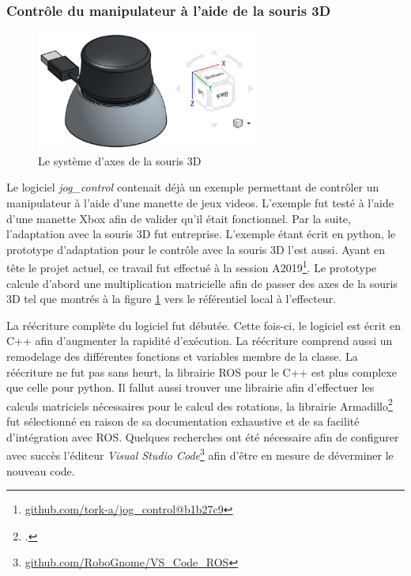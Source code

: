 \subsubsection{Contrôle du manipulateur à l'aide de la souris 3D}
\begin{figure}
    \centering
    \includegraphics[width=0.65\textwidth]{Figures/spacemouse_axis_4.png}
    \caption{Le système d'axes de la souris 3D}
    \label{fig:spacemouse_axis}
\end{figure}

Le logiciel \emph{jog\_control} contenait déjà un exemple permettant de contrôler un manipulateur à l'aide d'une manette de jeux videos. L'exemple fut testé à l'aide d'une manette Xbox afin de valider qu'il était fonctionnel. Par la suite, l'adaptation avec la souris 3D fut entreprise. L'exemple étant écrit en python, le prototype d'adaptation pour le contrôle avec la souris 3D l'est aussi. Ayant en tête le projet actuel, ce travail fut effectué à la session A2019\footnote{\href{https://github.com/tork-a/jog_control/commit/b1b27c9a034a166a8e04d271c7839f4741c848b4}{github.com/tork-a/jog\_control@b1b27c9}}. Le prototype calcule d'abord une multiplication matricielle afin de passer des axes de la souris 3D tel que montrés à la figure \ref{fig:spacemouse_axis} vers le référentiel local à l'effecteur. 


La réécriture complète du logiciel fut débutée. Cette fois-ci, le logiciel est écrit en C++ afin d'augmenter la rapidité d'exécution. La réécriture comprend aussi un remodelage des différentes fonctions et variables membre de la classe. La réécriture ne fut pas sans heurt, la librairie ROS pour le C++ est plus complexe que celle pour python. Il fallut aussi trouver une librairie afin d'effectuer les calculs matriciels nécessaires pour le calcul des rotations, la librairie Armadillo\footcite{sanderson_armadillo_2016} fut sélectionné en raison de sa documentation exhaustive et de sa facilité d'intégration avec ROS. Quelques recherches ont été nécessaire afin de configurer avec succès l'éditeur \emph{Visual Studio Code}\footnote{\href{https://github.com/RoboGnome/VS_Code_ROS}{github.com/RoboGnome/VS\_Code\_ROS}} afin d'être en mesure de déverminer le nouveau code. 

